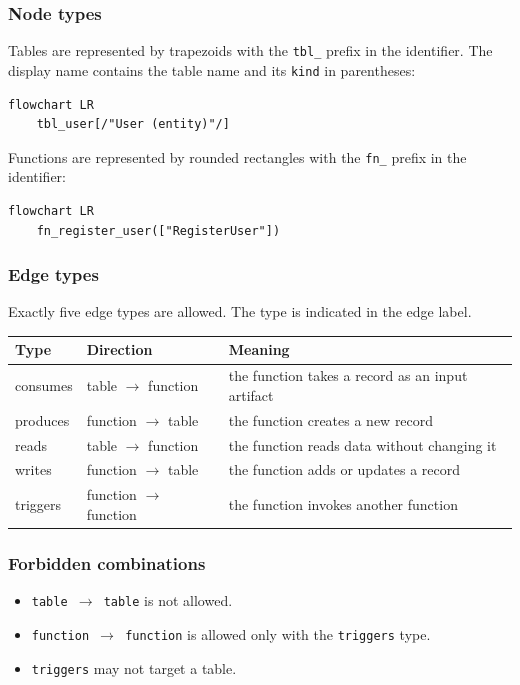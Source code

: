\subsubsection{Node types}

Tables are represented by trapezoids with the \texttt{tbl\_} prefix in the identifier. The display name contains the table name and its \texttt{kind} in parentheses:

\begin{verbatim}
flowchart LR
    tbl_user[/"User (entity)"/]
\end{verbatim}

Functions are represented by rounded rectangles with the \texttt{fn\_} prefix in the identifier:

\begin{verbatim}
flowchart LR
    fn_register_user(["RegisterUser"])
\end{verbatim}

\subsubsection{Edge types}

Exactly five edge types are allowed. The type is indicated in the edge label.

\begin{tabular}{lll}
\hline
\textbf{Type} & \textbf{Direction} & \textbf{Meaning} \\
\hline
consumes & table $\to$ function & the function takes a record as an input artifact \\
produces & function $\to$ table & the function creates a new record \\
reads & table $\to$ function & the function reads data without changing it \\
writes & function $\to$ table & the function adds or updates a record \\
triggers & function $\to$ function & the function invokes another function \\
\hline
\end{tabular}

\subsubsection{Forbidden combinations}

\begin{itemize}
\item \texttt{table $\to$ table} is not allowed.
\item \texttt{function $\to$ function} is allowed only with the \texttt{triggers} type.
\item \texttt{triggers} may not target a table.
\end{itemize}


